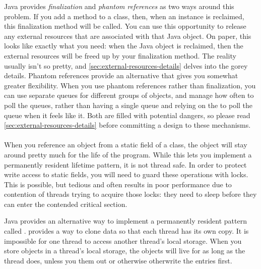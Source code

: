 Java provides \emph{finalization} and \emph{phantom references} as two ways
around this problem.
If you add a  method to a class, then, when an instance is
reclaimed, this finalization method will be called. You can use this opportunity
to release any external resources that are associated with that Java object. On
paper, this looks like exactly what you need: when the Java object is reclaimed,
then the external resources will be freed up by your finalization method. The
reality usually isn't so pretty, and \autoref{sec:external-resources-details}
delves into the gorey details. Phantom references provide an alternative that
gives you somewhat greater flexibility. When you use phantom references rather
than finalization, you can use separate queues for different groups of objects,
and manage how often to poll the queues, rather than having a single queue and
relying on the \jre to poll the queue when it feels like it. Both are filled
with potential dangers, so please read \autoref{sec:external-resources-details}
before committing a design to these mechanisms.

\paragraph{\TLS}
\tlsindex %
When you reference an object from a static field of a class, the object will
stay around pretty much for the life of the program. While this lets you
implement a permanently resident lifetime pattern, it is not thread safe. In
order to protect write access to static fields, you will need to guard these
operations with locks. This is possible, but tedious and often results in poor
performance due to contention of threads trying to acquire those locks: they
need to sleep before they can enter the contended critical section.

Java provides an alternative way to implement a permanently resident pattern
called \emph{\tls\/}. \tls provides a way to clone data so that each thread has
its own copy. It is impossible for one thread to access another thread's local
storage. When you store objects in a thread's local storage, the objects will
live for as long as the thread does, unless you  them out or
otherwise otherwrite the entries first.

